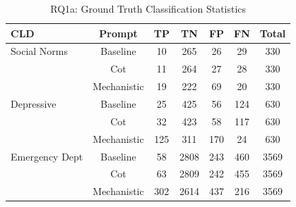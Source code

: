 \begin{table}[htbp]
\centreing
\caption{RQ1a: Ground Truth Classification Statistics}
\label{tab:rq1a_gt_classification}
\begin{tabular}{lcccccc}
\toprule
\textbf{CLD} & \textbf{Prompt} & \textbf{TP} & \textbf{TN} & \textbf{FP} & \textbf{FN} & \textbf{Total} \\
\midrule
Social Norms & Baseline & 10 & 265 & 26 & 29 & 330 \\
 & Cot & 11 & 264 & 27 & 28 & 330 \\
 & Mechanistic & 19 & 222 & 69 & 20 & 330 \\
\midrule
Depressive & Baseline & 25 & 425 & 56 & 124 & 630 \\
 & Cot & 32 & 423 & 58 & 117 & 630 \\
 & Mechanistic & 125 & 311 & 170 & 24 & 630 \\
\midrule
Emergency Dept & Baseline & 58 & 2808 & 243 & 460 & 3569 \\
 & Cot & 63 & 2809 & 242 & 455 & 3569 \\
 & Mechanistic & 302 & 2614 & 437 & 216 & 3569 \\
\midrule
\bottomrule
\end{tabular}
\end{table}